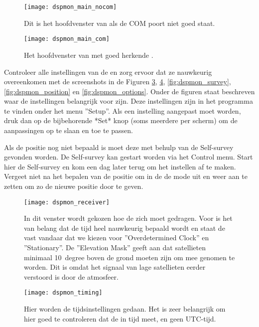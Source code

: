 \begin{figure}
    \centering
    \texttt{[image: dspmon\_main\_nocom]}
    \caption{Dit is het hoofdvenster van \dspmon als de COM poort niet
    goed staat.}
    \label{fig:dspmon_main_nocom}
\end{figure}

\begin{figure}
    \centering
    \texttt{[image: dspmon\_main\_com]}
    \caption{Het hoofdvenster van \dspmon met goed herkende \gps.}
    \label{fig:dspmon_main_com}
\end{figure}

Controleer alle instellingen van de \gps en zorg ervoor dat ze
nauwkeurig overeenkomen met de screenshots in de Figuren
\ref{fig:dspmon_receiver}, \ref{fig:dspmon_timing},
\ref{fig:dspmon_survey}, \ref{fig:dspmon_position} en
\ref{fig:dspmon_options}. Onder de figuren staat beschreven waar de
instellingen belangrijk voor zijn. Deze instellingen zijn in het
programma te vinden onder het menu ''Setup''. Als een instelling
aangepast moet worden, druk dan op de bijbehorende *Set* knop (soms
meerdere per scherm) om de aanpassingen op te slaan en toe te passen.

Als de \gps positie nog niet bepaald is moet deze met behulp van de Self-survey gevonden worden. De Self-survey kan gestart worden via het Control menu. Start hier de Self-survey en kom een dag later terug om het instellen af te maken.
Vergeet niet na het bepalen van de positie om in de \hisparc \daq de
\daq mode uit en weer aan te zetten om zo de nieuwe positie door te
geven.

\begin{figure}
    \centering
    \texttt{[image: dspmon\_receiver]}
    \caption{In dit venster wordt gekozen hoe de \gps zich moet gedragen.
    Voor \hisparc is het van belang dat de tijd heel nauwkeurig bepaald
    wordt en staat de \gps vast vandaar dat we kiezen voor
    ''Overdetermined Clock'' en ''Stationary''. De ''Elevation Mask''
    geeft aan dat satellieten minimaal \SI{10}{degree} boven de grond
    moeten zijn om mee genomen te worden. Dit is omdat het signaal van
    lage satellieten eerder verstoord is door de atmosfeer.}
    \label{fig:dspmon_receiver}
\end{figure}

\begin{figure}
    \centering
    \texttt{[image: dspmon\_timing]}
    \caption{Hier worden de tijdsinstellingen gedaan. Het is zeer
    belangrijk om hier goed te controleren dat de \gps in \gps tijd
    meet, en geen UTC-tijd.}
    \label{fig:dspmon_timing}
\end{figure}


